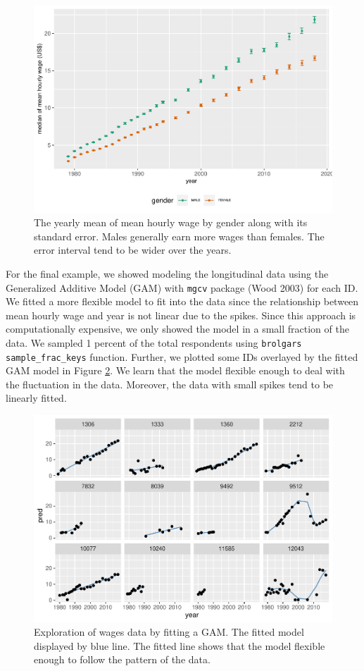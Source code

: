 \documentclass{article}
\begin{document}
\begin{figure}
\centering
\includegraphics{figures/se-gender-1.pdf}
\caption{\label{fig:se-gender}The yearly mean of mean hourly wage by gender along with its standard error. Males generally earn more wages than females. The error interval tend to be wider over the years.}
\end{figure}

For the final example, we showed modeling the longitudinal data using the Generalized Additive Model (GAM) with \texttt{mgcv} package (Wood 2003) for each ID. We fitted a more flexible model to fit into the data since the relationship between mean hourly wage and year is not linear due to the spikes. Since this approach is computationally expensive, we only showed the model in a small fraction of the data. We sampled 1 percent of the total respondents using \texttt{brolgar\textquotesingle{}s} \texttt{sample\_frac\_keys} function. Further, we plotted some IDs overlayed by the fitted GAM model in Figure \ref{fig:plot-gam}. We learn that the model flexible enough to deal with the fluctuation in the data. Moreover, the data with small spikes tend to be linearly fitted.

\begin{figure}
\centering
\includegraphics{figures/plot-gam-1.pdf}
\caption{\label{fig:plot-gam}Exploration of wages data by fitting a GAM. The fitted model displayed by blue line. The fitted line shows that the model flexible enough to follow the pattern of the data.}
\end{figure}
\end{document}
